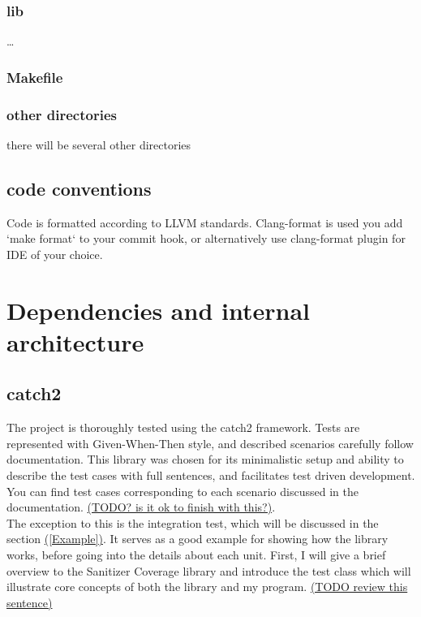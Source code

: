 \documentclass{elteikthesis}[2018/06/06]
\begin{document}
\subsubsection{lib}
\label{sec-3-1-1-5}
\ldots{} \\
\subsubsection{Makefile}
\label{sec-3-1-1-6}

\subsubsection{other directories}
\label{sec-3-1-1-7}
there will be several other directories \\
\subsection{code conventions}
\label{sec-3-1-2}
Code is formatted according to LLVM standards. Clang-format is used  you add `make format` to your commit hook, or alternatively use clang-format plugin for IDE of your choice. \\
\section{Dependencies and internal architecture}
\label{sec-3-2}
\subsection{catch2}
\label{sec-3-2-1}
The project is thoroughly tested using the catch2 framework. Tests are represented with Given-When-Then style, and described scenarios carefully follow documentation. This library was chosen for its minimalistic setup and ability to describe the test cases with full sentences, and facilitates test driven development. You can find test cases corresponding to each scenario discussed in the documentation. \uline{(TODO? is it ok to finish with this?)}. \\


The exception to this is the integration test, which will be discussed in the section \uline{([Example])}. It serves as a good example for showing how the library works, before going into the details about each unit. First, I will give a brief overview to the Sanitizer Coverage library and introduce the test class which will illustrate core concepts of both the library and my program. \uline{(TODO review this sentence)} \\
\end{document}
